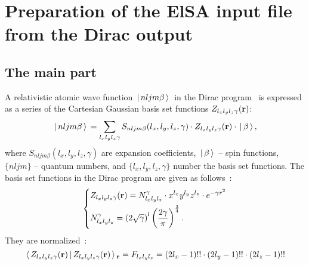 \documentclass[12pt,openright,twoside,headsepline,bibtotoc]{scrbook}
\begin{document}

\chapter{Preparation of the ElSA input file from the Dirac output}

\section{The main part}\label{sec:main}

A relativistic atomic wave function $\,| \, n l j m \beta \, \rangle\,$ in the Dirac program~\cite{Dirac_program} is expressed as a series of the Cartesian Gaussian basis set functions $Z_{l_x l_y l_z \gamma}(\mathbf{r})$: 
%
\begin{equation}
\,| \, n l j m \beta \, \rangle\, = \sum_{l_x l_y l_z \gamma} S_{n l j m \beta}(l_x, l_y, l_z, \gamma) \cdot Z_{l_x l_y l_z \gamma}(\mathbf{r}) \cdot \,| \, \beta \, \rangle\,,
\label{eq:phi_Dirac}
\end{equation}
where $S_{n l j m \beta}(l_x, l_y, l_z, \gamma)$ are expansion coefficients, $\,| \, \beta \, \rangle\,$ -- spin functions, $\{n l j m\}$ -- quantum numbers, and $\{ l_x, l_y, l_z, \gamma \}$ number the basis set functions. The basis set functions in the Dirac program are given as follows~\cite{Dirac:basis_set}:
%
\begin{equation}
\left\{
\begin{aligned}
&Z_{l_x l_y l_z \gamma}(\mathbf{r}) = N^\gamma_{l_x l_y l_z} \cdot x^{l_x} y^{l_y} z^{l_z} \cdot e^{-\gamma r^2}
\\
&N^\gamma_{l_x l_y l_z} = \left(2 \sqrt{\gamma} \right)^l \left( \frac{2 \gamma}{\pi} \right)^\frac{3}{4} .
\end{aligned}
\right.
\end{equation}
%
They are normalized~\cite{Dirac:basis_set}:
%
\begin{equation}
\,\langle \, Z_{l_x l_y l_z \gamma}(\mathbf{r}) \, | \, Z_{l_x l_y l_z \gamma}(\mathbf{r}) \, \rangle\,_{\mathbf{r}} = F_{l_x l_y l_z} = (2l_x-1)!! \cdot (2l_y-1)!! \cdot (2l_z-1)!! 
\end{equation}
%
\end{document}
